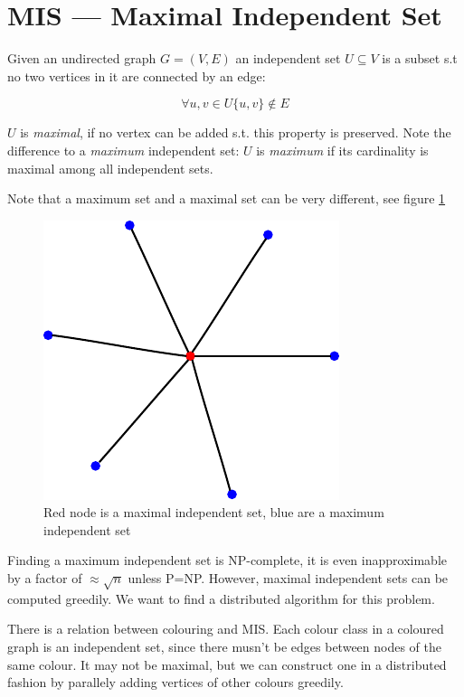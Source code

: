 \section{MIS --- Maximal Independent Set}

\begin{Def} Given an undirected graph $G=(V,E)$ an independent set $U\subseteq V$ is a subset s.t no two vertices in it are connected by an edge:

\[\forall u,v \in U \{u,v\}\not \in E\]

$U$ is \emph{maximal}, if no vertex can be added s.t. this property is preserved. Note the difference to a \emph{maximum} independent set: $U$ is \emph{maximum} if its cardinality is maximal among all independent sets.
\end{Def}

Note that a maximum set and a maximal set can be very different, see figure \ref{fig:maximum_vs_maximal_is} 

\begin{figure}[hbt]
\begin{center}
\includegraphics{./images/mis}
\end{center}
\caption{Red node is a maximal independent set, blue are a maximum independent set}
\label{fig:maximum_vs_maximal_is}
\end{figure}

Finding a maximum independent set is NP-complete, it is even inapproximable by a factor of $\approx \sqrt{n}$ unless P=NP. However, maximal independent sets can be computed greedily. We want to find a distributed algorithm for this problem.

There is a relation between colouring and MIS. Each colour class in a coloured graph is an independent set, since there musn't be edges between nodes of the same colour. It may not be maximal, but we can construct one in a distributed fashion by parallely adding vertices of other colours greedily.


